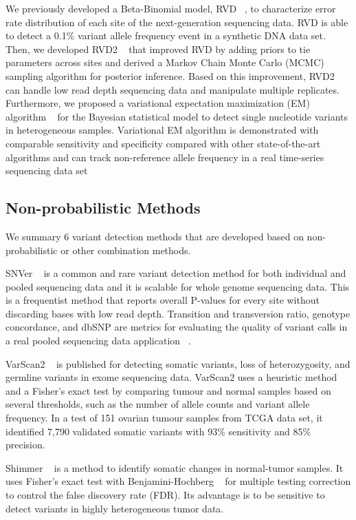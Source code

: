 \documentclass[11pt,reqno]{amsart}
\begin{document}
We previously developed a Beta-Binomial model, RVD ~\citep{Flaherty2012}, to characterize error rate distribution of each site of the next-generation sequencing data.
RVD is able to detect a 0.1\% variant allele frequency event in a synthetic DNA data set.
Then, we developed RVD2 ~\citep{He2015} that improved RVD by adding priors to tie parameters across sites and derived a Markov Chain Monte Carlo (MCMC) sampling algorithm for posterior inference.
Based on this improvement, RVD2 can handle low read depth sequencing data and manipulate multiple replicates.
Furthermore, we proposed a variational expectation maximization (EM) algorithm ~\citep{zhang2016variational} for the Bayesian statistical model to detect single nucleotide variants in heterogeneous samples.
Variational EM algorithm is demonstrated with comparable sensitivity and specificity compared with other state-of-the-art algorithms and can track non-reference allele frequency in a real time-series sequencing data set


\subsection{Non-probabilistic Methods}
We summary 6 variant detection methods that are developed based on non-probabilistic or other combination methods.

SNVer ~\citep{Wei2011} is a common and rare variant detection method for both individual and pooled sequencing data and it is scalable for whole genome sequencing data.
This is a frequentist method that reports overall P-values for every site without discarding bases with low read depth.
Transition and transversion ratio, genotype concordance, and dbSNP are metrics for evaluating the quality of variant calls in a real pooled sequencing data application ~\citep{depristo2011framework}.

VarScan2 ~\citep{Koboldt2012} is published for detecting somatic variants, loss of heterozygosity, and germline variants in exome sequencing data.
VarScan2 uses a heuristic method and a Fisher's exact test by comparing tumour and normal samples based on several thresholds, such as the number of allele counts and variant allele frequency.
In a test of 151 ovarian tumour samples from TCGA data set, it identified 7,790 validated somatic variants with 93\% sensitivity and 85\% precision.

Shimmer ~\citep{Hansen2013} is a method to identify somatic changes in normal-tumor samples.
It uses Fisher's exact test with Benjamini-Hochberg ~\citep{benjamini1995controlling} for multiple testing correction to control the false discovery rate (FDR).
Its advantage is to be sensitive to detect variants in highly heterogeneous tumor data.
\end{document}
